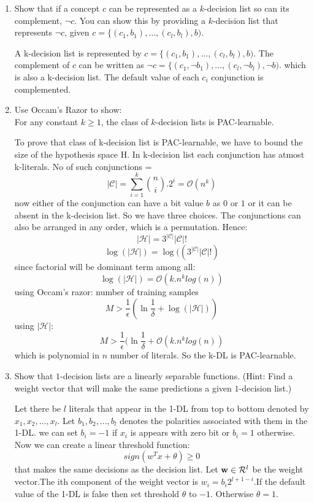 \begin{enumerate}
\item \relax[8 points] Show that if a concept $c$ can be represented
  as a $k$-decision list so can its complement, $\neg c$. You can show
  this by providing a $k$-decision list that represents $\neg c$,
  given $c = \{(c_{1},b_{1}), \ldots, (c_{l},b_{l}),b)$.
\begin{solution}
A k-decision list is represented by $c = \{(c_{1},b_{1}), \ldots, (c_{l},b_{l}),b)$. The complement of $c$ can be written as $\neg c = \{(c_{1}, \neg b_{1}), \ldots, (c_{l},\neg b_{l}),\neg b)$. which is also a k-decision list. The default value of each $c_{i}$ conjunction is complemented.
\end{solution}
\item \relax[9 points] Use  Occam's Razor to show: \\
  For any constant $k \geq 1$, the class of $k$-decision lists is
  PAC-learnable.
\begin{solution}
To prove that class of k-decision list is PAC-learnable, we have to bound the size of the hypothesis space H.
In k-decision list each conjunction has atmost k-literals.
No of such conjunctions =
\[ |\mathcal{C}| = \sum_{i=1}^k {n\choose i}.2^i = \mathcal{O}(n^k) \]  
now either of the conjunction can have a bit value $b$ as $0$ or $1$ or it can be absent in the k-decision list. So we have three choices. The conjunctions can also be arranged in any order, which is a permutation.
Hence:
\[ |\mathcal{H}| = 3^{|\mathcal{C}|} |\mathcal{C}|!\] 
\[ \log(|\mathcal{H}|) = \log( (3^{|\mathcal{C}|} |\mathcal{C}|!)\]
since factorial will be dominant term among all:
\[ \log(|\mathcal{H}|) = \mathcal{O}(k.n^klog(n))  \]
using Occam's razor:
number of training samples 
\[ M > \frac{1}{\epsilon }( \ln \frac{1}{\delta} + \log(|\mathcal{H}|)) \]
using $|\mathcal{H}|$:
\[ M > \frac{1}{\epsilon }( \ln \frac{1}{\delta} + \mathcal{O}(k.n^klog(n)) \]
which is polynomial in $n$ number of literals. So the k-DL is PAC-learnable.
\end{solution}
\item \relax[8 points] Show that $1$-decision lists are a linearly
  separable functions. (Hint: Find a weight vector that will make the
  same predictions a given $1$-decision list.)
\begin{solution}
Let there be $l$ literals that appear in the 1-DL from top to bottom denoted by  $x_1,x_2,...,x_l$.  Let $b_1,b_2,...,b_l$  denotes the polarities associated with them in the 1-DL. we can set $b_i = -1$ if $x_i$ is appears with zero bit  or $b_i = 1$ otherwise.
Now we can create a linear threshold function: 
\[ sign( w^T  x + \theta ) \ge 0  \] 
that makes the same decisions as the decision list. Let ${\bf w} \in \mathcal{R}^l$ be the weight vector.The ith component of the weight vector is $w_i = b_i 2^{l+1-i}$.If the default value of the 1-DL is false then set threshold $\theta$ to $-1$. Otherwise $\theta=1$. 


\end{solution}
\end{enumerate}
